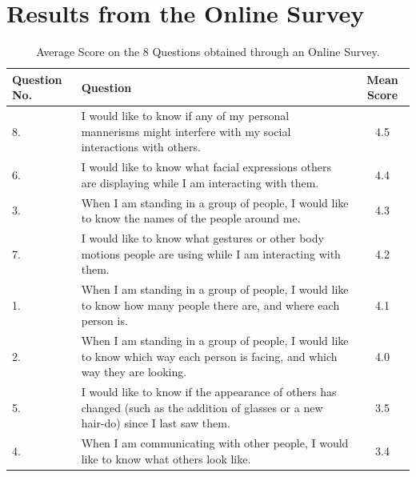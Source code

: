 \documentclass[oneside,11pt]{memoir}
\begin{document}
\section{Results from the Online Survey}

\begin{table}[h]
\caption{Average Score on the 8 Questions obtained through an Online Survey.}
\label{Tab:Table5}
\begin{center}
\begin{tabularx}{5in}{|l|X|c|}
\hline
Question No. & Question & Mean Score\\
\hline
8. & I would like to know if any of my personal mannerisms might interfere with my social interactions with others. & 4.5 \\
\hline
6. & I would like to know what facial expressions others are displaying while I am interacting with them. & 4.4 \\
\hline
3. & When I am standing in a group of people, I would like to know the names of the people around me. & 4.3 \\
\hline
7. & I would like to know what gestures or other body motions people are using while I am interacting with them. & 4.2 \\
\hline
1. & When I am standing in a group of people, I would like to know how many people there are, and where each person is. & 4.1 \\
\hline
2. & When I am standing in a group of people, I would like to know which way each person is facing, and which way they are looking. & 4.0 \\
\hline
5. & I would like to know if the appearance of others has changed (such as the addition of glasses or a new hair-do) since I last saw them. & 3.5 \\
\hline
4. & When I am communicating with other people, I would like to know what others look like. & 3.4 \\
\hline
\end{tabularx}
\end{center}
\end{table}

\vspace*{1in}
\begin{SingleSpace}
	

\end{SingleSpace}
\end{document}
